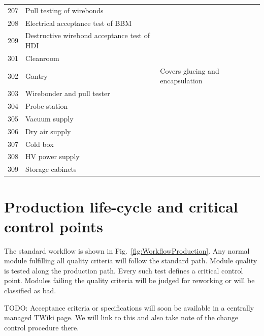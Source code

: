 \documentclass[12pt]{unlsilabsop}
\begin{document}
\begin{table}[hH]
\begin{center}
{\begin{tabular}{lp{7cm}p{6cm}}
207 & Pull testing of wirebonds & \\
208 & Electrical acceptance test of BBM & \\
209 & Destructive wirebond acceptance test of HDI & \\
\midrule
301 & Cleanroom & \\
302 & Gantry & Covers glueing and encapsulation \\
303 & Wirebonder and pull tester & \\
304 & Probe station & \\
305 & Vacuum supply & \\
306 & Dry air supply & \\
307 & Cold box & \\
308 & HV power supply & \\
309 & Storage cabinets & \\
\bottomrule
\end{tabular}
}
\end{center}
\end{table}

\section{Production life-cycle and critical control points}

The standard workflow is shown in Fig.~\ref{fig:WorkflowProduction}. Any normal module fulfilling all quality criteria will follow the standard path. Module quality is tested along the production path. Every such test defines a critical control point. Modules failing the quality criteria will be judged for reworking or will be classified as bad.

TODO: Acceptance criteria or specifications will soon be available in a centrally managed TWiki page. We will link to this and also take note of the change control procedure there.
\end{document}
